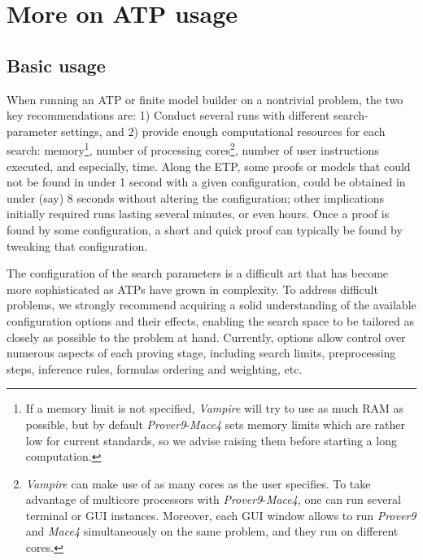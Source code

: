 \section{More on ATP usage}\label{atp-app}

\subsection{Basic usage}
When running an ATP or finite model builder on a nontrivial problem, the two key recommendations are: 1) Conduct several runs with different search-parameter settings, and 2) provide enough computational resources for each search: memory\footnote{If a memory limit is not specified, \emph{Vampire} will try to use as much RAM as possible, but by default \emph{Prover9}-\emph{Mace4} sets memory limits which are rather low for current standards, so we advise raising them before starting a long computation.}, number of processing cores\footnote{\emph{Vampire} can make use of as many cores as the user specifies. To take advantage of multicore processors with \emph{Prover9}-\emph{Mace4}, one can run several terminal or GUI instances. Moreover, each GUI window allows to run \emph{Prover9} and \emph{Mace4} simultaneously on the same problem, and they run on different cores.}, number of user instructions executed, and especially, time. Along the ETP, some proofs or models that could not be found in under 1 second with a given configuration, could be obtained in under (say) 8 seconds without altering the configuration; other implications initially required runs lasting several minutes, or even hours. Once a proof is found by some configuration, a short and quick proof can typically be found by tweaking that configuration.

The configuration of the search parameters is a difficult art that has become more sophisticated as ATPs have grown in complexity. To address difficult problems, we strongly recommend acquiring a solid understanding of the available configuration options and their effects, enabling the search space to be tailored as closely as possible to the problem at hand. Currently, options allow control over numerous aspects of each proving stage, including search limits, preprocessing steps, inference rules, formulas ordering and weighting, etc.

